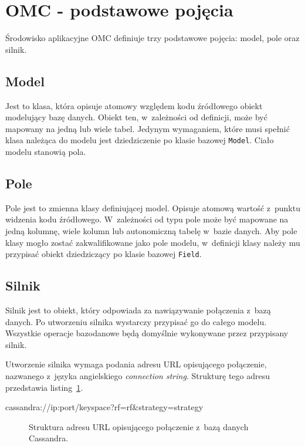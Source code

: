 \section{OMC - podstawowe pojęcia}

Środowisko aplikacyjne OMC definiuje trzy podstawowe pojęcia: model, pole oraz silnik.

\subsection{Model}

Jest to klasa, która opisuje atomowy względem kodu źródłowego obiekt modelujący bazę danych. Obiekt ten, w~zależności od definicji, może być mapowany na jedną lub wiele tabel. Jedynym wymaganiem, które musi spełnić klasa należąca do modelu jest dziedziczenie po klasie bazowej \verb+Model+. Ciało modelu stanowią pola.

\subsection{Pole}

Pole jest to zmienna klasy definiującej model. Opisuje atomową wartość z~punktu widzenia kodu źródłowego. W~zależności od typu pole może być mapowane na jedną kolumnę, wiele kolumn lub autonomiczną tabelę w~bazie danych. Aby pole klasy mogło zostać zakwalifikowane jako pole modelu, w~definicji klasy należy mu przypisać obiekt dziedziczący po klasie bazowej \verb+Field+.

\subsection{Silnik}

Silnik jest to obiekt, który odpowiada za nawiązywanie połączenia z~bazą danych. Po utworzeniu silnika wystarczy przypisać go do całego modelu. Wszystkie operacje bazodanowe będą domyślnie wykonywane przez przypisany silnik. 

Utworzenie silnika wymaga podania adresu URL opisującego połączenie, nazwanego z~języka angielskiego \emph{connection string}. Strukturę tego adresu przedstawia listing~\ref{lst:connection_string}.

\begin{verbbox}
	cassandra://{ip}:{port}/{keyspace}?rf={rf}&strategy={strategy}
\end{verbbox}

\begin{figure}[ht!]
	\centering
	\theverbbox
	\caption{Struktura adresu URL opisującego połączenie z~bazą danych Cassandra.}
	\label{lst:connection_string}
\end{figure}

